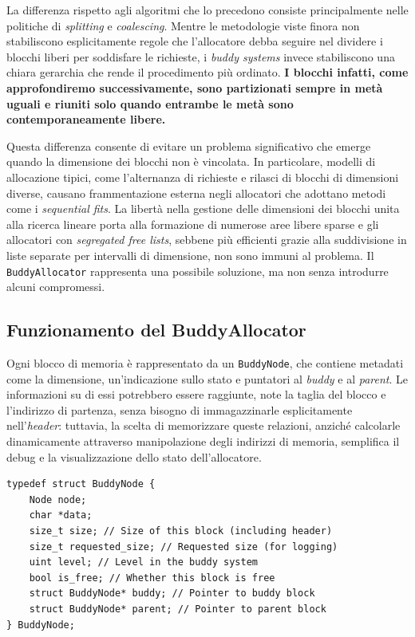 La differenza rispetto agli algoritmi che lo precedono consiste principalmente nelle politiche di \textit{splitting} e \textit{coalescing}. Mentre le metodologie viste finora non stabiliscono esplicitamente regole che l'allocatore debba seguire nel dividere i blocchi liberi per soddisfare le richieste, i \textit{buddy systems} invece stabiliscono una chiara gerarchia che rende il procedimento più ordinato. \textbf{I blocchi infatti, come approfondiremo successivamente, sono partizionati sempre in metà uguali e riuniti solo quando entrambe le metà sono contemporaneamente libere.}

Questa differenza consente di evitare un problema significativo che emerge quando la dimensione dei blocchi non è vincolata. In particolare, modelli di allocazione tipici, come l'alternanza di richieste e rilasci di blocchi di dimensioni diverse, causano frammentazione esterna negli allocatori che adottano metodi come i \textit{sequential fits}. La libertà nella gestione delle dimensioni dei blocchi unita alla ricerca lineare porta alla formazione di numerose aree libere sparse e gli allocatori con \textit{segregated free lists}, sebbene più efficienti grazie alla suddivisione in liste separate per intervalli di dimensione, non sono immuni al problema. Il \texttt{BuddyAllocator} rappresenta una possibile soluzione, ma non senza introdurre alcuni compromessi.

\subsection*{Funzionamento del BuddyAllocator}
Ogni blocco di memoria è rappresentato da un \texttt{BuddyNode}, che contiene metadati come la dimensione, un’indicazione sullo stato e puntatori al \textit{buddy} e al \textit{parent}. Le informazioni su di essi potrebbero essere raggiunte, note la taglia del blocco e l’indirizzo di partenza, senza bisogno di immagazzinarle esplicitamente nell’\textit{header}: tuttavia, la scelta di memorizzare queste relazioni, anziché calcolarle dinamicamente attraverso manipolazione degli indirizzi di memoria, semplifica il debug e la visualizzazione dello stato dell'allocatore.

\begin{lstlisting}
typedef struct BuddyNode {
    Node node;
    char *data;
    size_t size; // Size of this block (including header)
    size_t requested_size; // Requested size (for logging)
    uint level; // Level in the buddy system
    bool is_free; // Whether this block is free
    struct BuddyNode* buddy; // Pointer to buddy block
    struct BuddyNode* parent; // Pointer to parent block
} BuddyNode;
\end{lstlisting}

